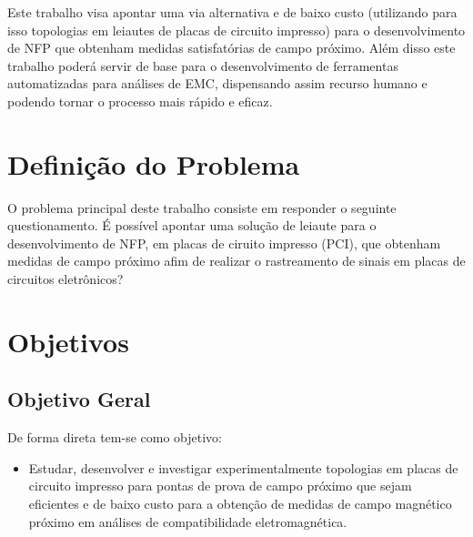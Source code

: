 
Este trabalho visa apontar uma via alternativa e de baixo custo (utilizando para isso topologias em leiautes de placas de circuito impresso) para o desenvolvimento de NFP que obtenham medidas satisfatórias de campo próximo. Além disso este trabalho poderá servir de base para o desenvolvimento de ferramentas automatizadas para análises de EMC, dispensando assim recurso humano e podendo tornar o processo mais rápido e eficaz.



\section{Definição do Problema}
O problema principal deste trabalho consiste em responder o seguinte questionamento. É possível apontar uma solução de leiaute para o desenvolvimento de NFP, em placas de ciruito impresso (PCI), que obtenham medidas de campo próximo afim de realizar o rastreamento de sinais em placas de circuitos eletrônicos?

\section{Objetivos}


\subsection{Objetivo Geral}
De forma direta tem-se como objetivo:

\begin{itemize}
\item Estudar, desenvolver e investigar experimentalmente topologias em placas de circuito impresso para pontas de prova de campo próximo que sejam eficientes e de baixo custo para a obtenção de medidas de campo magnético próximo em análises de compatibilidade eletromagnética.
\end{itemize}

